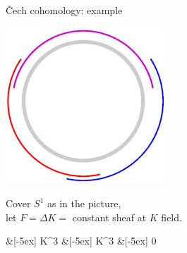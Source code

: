 \begin{frame}{\v{C}ech cohomology: example}
	\vspace{1ex}
	\begin{minipage}[b]{\textwidth}
		\begin{minipage}{.4\textwidth}
			\includegraphics[width=.6\columnwidth]{figures/s1_cover.png}
		\end{minipage}%
		\begin{minipage}{.6\textwidth}
			Cover $S^1$ as in the picture,\\let $F = \Delta K = $ constant sheaf at $K$ field.
			\begin{diagram*}
				  \arrow{r} \&[-5ex] K^3  \&[-5ex] K^3  \&[-5ex] 0
			\end{diagram*}
		\end{minipage}
	\end{minipage}
	\vspace{1ex}
\end{frame}
